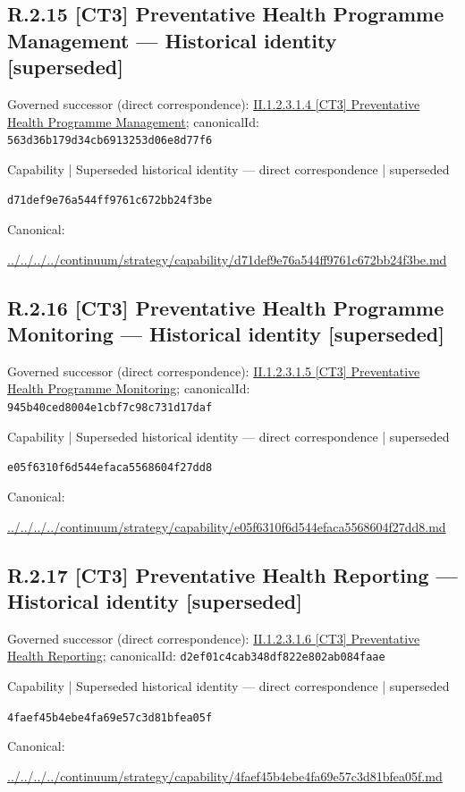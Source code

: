 \documentclass[10pt,a4paper]{article}
\begin{document}
\subsection*{R.2.15 [CT3] Preventative Health Programme Management — Historical identity [superseded]}
Governed successor (direct correspondence): \hyperref[element-563d36b179d34cb6913253d06e8d77f6]{II.1.2.3.1.4 [CT3] Preventative Health Programme Management}; canonicalId: \texttt{563d36b179d34cb6913253d06e8d77f6}\par
\label{element-d71def9e76a544ff9761c672bb24f3be}
{\small Capability | Superseded historical identity — direct correspondence | superseded}\par
\texttt{d71def9e76a544ff9761c672bb24f3be}\par
Canonical: \par
{\footnotesize\url{../../../../continuum/strategy/capability/d71def9e76a544ff9761c672bb24f3be.md}}\par
\subsection*{R.2.16 [CT3] Preventative Health Programme Monitoring — Historical identity [superseded]}
Governed successor (direct correspondence): \hyperref[element-945b40ced8004e1cbf7c98c731d17daf]{II.1.2.3.1.5 [CT3] Preventative Health Programme Monitoring}; canonicalId: \texttt{945b40ced8004e1cbf7c98c731d17daf}\par
\label{element-e05f6310f6d544efaca5568604f27dd8}
{\small Capability | Superseded historical identity — direct correspondence | superseded}\par
\texttt{e05f6310f6d544efaca5568604f27dd8}\par
Canonical: \par
{\footnotesize\url{../../../../continuum/strategy/capability/e05f6310f6d544efaca5568604f27dd8.md}}\par
\subsection*{R.2.17 [CT3] Preventative Health Reporting — Historical identity [superseded]}
Governed successor (direct correspondence): \hyperref[element-d2ef01c4cab348df822e802ab084faae]{II.1.2.3.1.6 [CT3] Preventative Health Reporting}; canonicalId: \texttt{d2ef01c4cab348df822e802ab084faae}\par
\label{element-4faef45b4ebe4fa69e57c3d81bfea05f}
{\small Capability | Superseded historical identity — direct correspondence | superseded}\par
\texttt{4faef45b4ebe4fa69e57c3d81bfea05f}\par
Canonical: \par
{\footnotesize\url{../../../../continuum/strategy/capability/4faef45b4ebe4fa69e57c3d81bfea05f.md}}\par
\end{document}
